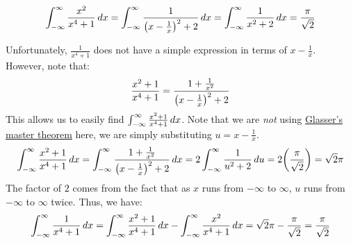 \documentclass[main.tex]{subfiles}
\begin{document}
\begin{example}
    \begin{equation*}
        \int_{-\infty}^{\infty} \frac{x^2}{x^4+1}\,dx
        = \int_{-\infty}^{\infty} \frac{1}{\qty(x-\frac{1}{x})^2+2}\,dx
        = \int_{-\infty}^{\infty} \frac{1}{x^2+2}\,dx
        = \frac{\pi}{\sqrt{2}}
    \end{equation*}
\end{example}

\begin{example}
    Unfortunately, $\frac{1}{x^4+1}$ does not have a simple expression in terms of $x-\frac{1}{x}$. However, note that:
    \begin{equation*}
        \frac{x^2+1}{x^4+1}
        = \frac{1+\frac{1}{x^2}}{\qty(x-\frac{1}{x})^2+2}
    \end{equation*}
    This allows us to easily find $\int_{-\infty}^{\infty} \frac{x^2+1}{x^4+1}\,dx$. Note that we are \emph{not} using \hyperref[glassers_master_theorem]{Glasser's master theorem} here, we are simply substituting $u=x-\frac{1}{x}$.
    \begin{equation*}
        \int_{-\infty}^{\infty} \frac{x^2+1}{x^4+1}\,dx
        = \int_{-\infty}^{\infty} \frac{1+\frac{1}{x^2}}{\qty(x-\frac{1}{x})^2+2}\,dx
        = 2\int_{-\infty}^{\infty} \frac{1}{u^2+2}\,du
        = 2\qty(\frac{\pi}{\sqrt{2}})
        = \sqrt{2}\pi
    \end{equation*}
    The factor of $2$ comes from the fact that as $x$ runs from $-\infty$ to $\infty$, $u$ runs from $-\infty$ to $\infty$ twice. Thus, we have:
    \begin{equation*}
        \int_{-\infty}^{\infty} \frac{1}{x^4+1}\,dx
        = \int_{-\infty}^{\infty} \frac{x^2+1}{x^4+1}\,dx - \int_{-\infty}^{\infty} \frac{x^2}{x^4+1}\,dx
        = \sqrt{2}\pi - \frac{\pi}{\sqrt{2}}
        = \frac{\pi}{\sqrt{2}}
    \end{equation*}
\end{example}
\end{document}
